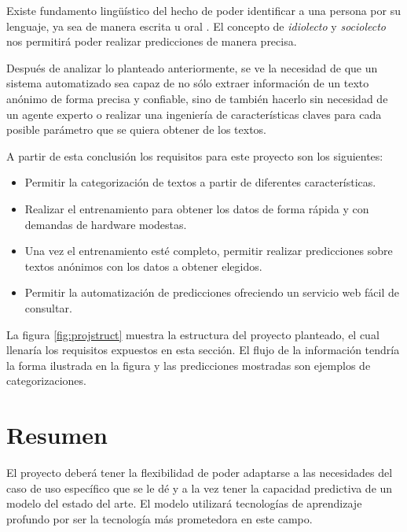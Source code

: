 Existe fundamento lingüístico del hecho de poder identificar a una persona por su lenguaje, ya sea de manera escrita u oral \parencite{coulthard2004author, louwerse2004semantic}. El concepto de \textit{idiolecto} y \textit{sociolecto} nos permitirá poder realizar predicciones de manera precisa.

Después de analizar lo planteado anteriormente, se ve la necesidad de que un sistema automatizado sea capaz de no sólo extraer información de un texto anónimo de forma precisa y confiable, sino de también hacerlo sin necesidad de un agente experto o realizar una ingeniería de características claves para cada posible parámetro que se quiera obtener de los textos.

A partir de esta conclusión los requisitos para este proyecto son los siguientes:

\begin{itemize}
\item Permitir la categorización de textos a partir de diferentes características.
\item Realizar el entrenamiento para obtener los datos de forma rápida y con demandas de hardware modestas.
\item Una vez el entrenamiento esté completo, permitir realizar predicciones sobre textos anónimos con los datos a obtener elegidos.
\item Permitir la automatización de predicciones ofreciendo un servicio web fácil de consultar.
\end{itemize}

La figura \ref{fig:projstruct} muestra la estructura del proyecto planteado, el cual llenaría los requisitos expuestos en esta sección. El flujo de la información tendría la forma ilustrada en la figura y las predicciones mostradas son ejemplos de categorizaciones.

\section{Resumen}

El proyecto deberá tener la flexibilidad de poder adaptarse a las necesidades del caso de uso específico que se le dé y a la vez tener la capacidad predictiva de un modelo del estado del arte. El modelo utilizará tecnologías de aprendizaje profundo por ser la tecnología más prometedora en este campo.





